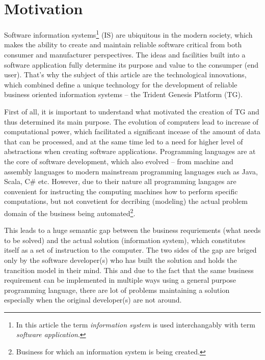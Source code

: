 \section{Motivation}\label{sec:01}
  Software information systems\footnote{In this article the term \emph{information system} is used interchangably with term \emph{software application}.} (IS) are ubiquitous in the modern society, which makes the ability to create and maintain reliable software critical from both consumer and manufacturer perspectives.
  The ideas and facilities built into a software application fully determine its purpose and value to the consumper (end user).
  That's why the subject of this article are the technological innovations, which combined define a unique technology for the development of reliable business oriented information systems -- the Trident Genesis Platform (TG).

  First of all, it is important to understand what motivated the creation of TG and thus determined its main purpose.
  The evolution of computers lead to increase of computational power, which facilitated a significant incease of the amount of data that can be processed, and at the same time led to a need for higher level of abstractions when creating software applications.
  Programming languages are at the core of software development, which also evolved -- from machine and assembly languages to modern mainstream programming languages such as Java, Scala, C\# etc.
  However, due to their nature all programming langages are convenient for instructing the computing machines how to perform specific computations, but not convetient for decribing (modeling) the actual problem domain of the business being automated\footnote{Business for which an information system is being created.}.
  
  This leads to a huge semantic gap between the business requriements (what needs to be solved) and the actual solution (information system), which constitutes itself as a set of instruction to the computer.
  The two sides of the gap are briged only by the software developer(s) who has built the solution and holds the trancition model in their mind.
  This and due to the fact that the same business requirement can be implemented in multiple ways using a general purpose programming language, there are lot of problems maintaining a solution especially when the original developer(s) are not around.

